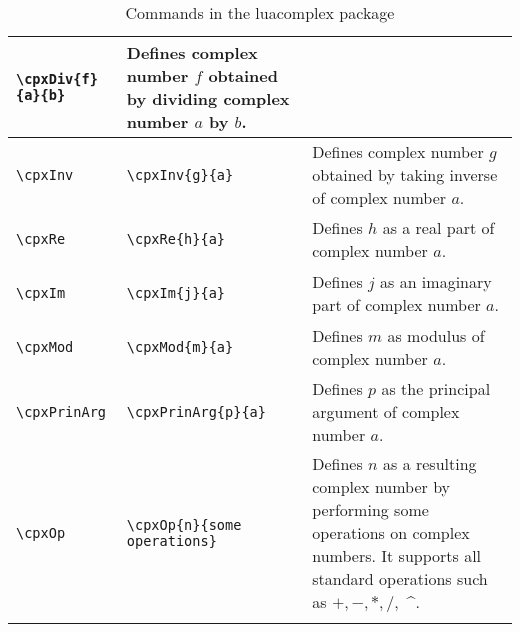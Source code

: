 \documentclass{article}
\begin{document}
\begin{longtable}{llm{6cm}}
\begin{lstlisting}
\cpxDiv{f}{a}{b}
\end{lstlisting} & Defines complex number \(f\) obtained by dividing complex number \(a\) by \(b\). \\
\midrule
\begin{lstlisting}
\cpxInv
\end{lstlisting} &
\begin{lstlisting}
\cpxInv{g}{a}
\end{lstlisting} & Defines complex number \(g\) obtained by taking inverse of complex number \(a\). \\
\midrule
\begin{lstlisting}
\cpxRe
\end{lstlisting} &
\begin{lstlisting}
\cpxRe{h}{a}
\end{lstlisting} & Defines  \(h\) as a real part of complex number \(a\). \\
\midrule
\begin{lstlisting}
\cpxIm
\end{lstlisting} &
\begin{lstlisting}
\cpxIm{j}{a}
\end{lstlisting} & Defines  \(j\) as an imaginary part of complex number \(a\). \\
\midrule
\begin{lstlisting}
\cpxMod
\end{lstlisting} &
\begin{lstlisting}
\cpxMod{m}{a}
\end{lstlisting} & Defines  \(m\) as modulus of complex number \(a\). \\
\midrule
\begin{lstlisting}
\cpxPrinArg
\end{lstlisting} &
\begin{lstlisting}
\cpxPrinArg{p}{a}
\end{lstlisting} & Defines  \(p\) as the principal argument of complex number \(a\). \\
\midrule
\begin{lstlisting}
\cpxOp
\end{lstlisting} &
\begin{lstlisting}
\cpxOp{n}{some operations}
\end{lstlisting} & Defines \(n\) as a resulting complex number by performing some operations on complex numbers. It supports all standard operations such as \(+,-,*, /, \)   \^{}.\\
\bottomrule
\caption{Commands in the luacomplex package}
\label{tbl:luacomplex}
\end{longtable}
\end{document}
